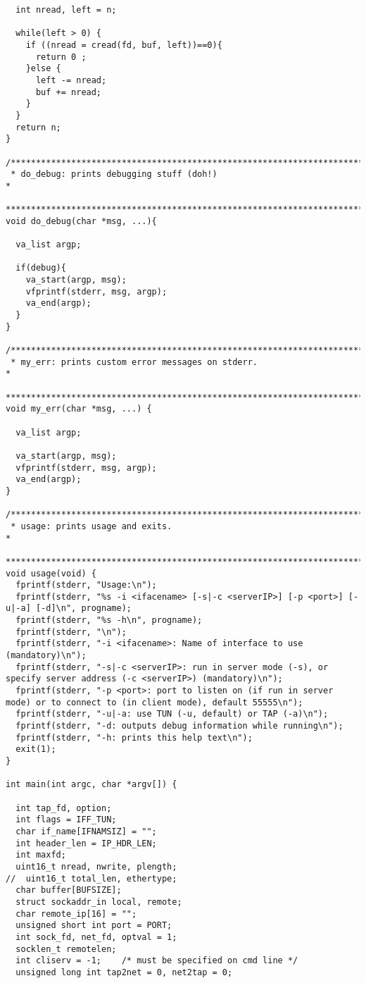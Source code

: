 \documentclass[a4paper,12pt]{article}
\begin{document}
\begin{verbatim}
  int nread, left = n;

  while(left > 0) {
    if ((nread = cread(fd, buf, left))==0){
      return 0 ;      
    }else {
      left -= nread;
      buf += nread;
    }
  }
  return n;  
}

/**************************************************************************
 * do_debug: prints debugging stuff (doh!)                                *
 **************************************************************************/
void do_debug(char *msg, ...){
  
  va_list argp;
  
  if(debug){
	va_start(argp, msg);
	vfprintf(stderr, msg, argp);
	va_end(argp);
  }
}

/**************************************************************************
 * my_err: prints custom error messages on stderr.                        *
 **************************************************************************/
void my_err(char *msg, ...) {

  va_list argp;
  
  va_start(argp, msg);
  vfprintf(stderr, msg, argp);
  va_end(argp);
}

/**************************************************************************
 * usage: prints usage and exits.                                         *
 **************************************************************************/
void usage(void) {
  fprintf(stderr, "Usage:\n");
  fprintf(stderr, "%s -i <ifacename> [-s|-c <serverIP>] [-p <port>] [-u|-a] [-d]\n", progname);
  fprintf(stderr, "%s -h\n", progname);
  fprintf(stderr, "\n");
  fprintf(stderr, "-i <ifacename>: Name of interface to use (mandatory)\n");
  fprintf(stderr, "-s|-c <serverIP>: run in server mode (-s), or specify server address (-c <serverIP>) (mandatory)\n");
  fprintf(stderr, "-p <port>: port to listen on (if run in server mode) or to connect to (in client mode), default 55555\n");
  fprintf(stderr, "-u|-a: use TUN (-u, default) or TAP (-a)\n");
  fprintf(stderr, "-d: outputs debug information while running\n");
  fprintf(stderr, "-h: prints this help text\n");
  exit(1);
}

int main(int argc, char *argv[]) {
  
  int tap_fd, option;
  int flags = IFF_TUN;
  char if_name[IFNAMSIZ] = "";
  int header_len = IP_HDR_LEN;
  int maxfd;
  uint16_t nread, nwrite, plength;
//  uint16_t total_len, ethertype;
  char buffer[BUFSIZE];
  struct sockaddr_in local, remote;
  char remote_ip[16] = "";
  unsigned short int port = PORT;
  int sock_fd, net_fd, optval = 1;
  socklen_t remotelen;
  int cliserv = -1;    /* must be specified on cmd line */
  unsigned long int tap2net = 0, net2tap = 0;


\end{verbatim}
\end{document}
